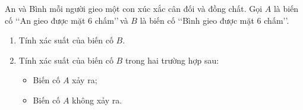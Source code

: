 \begin{bt}%
	An và Bình mỗi người gieo một con xúc xắc cân đối và đồng chất. Gọi $A$ là biến cố \lq\lq An gieo được mặt $6$ chấm\rq\rq $\,$và $B$ là biến cố \lq\lq Bình gieo được mặt $6$ chấm\rq\rq.
	\begin{enumerate}
		\item Tính xác suất của biến cố $B$.
		\item Tính xác suất của biến cố $B$ trong hai trường hợp sau:
		\begin{itemize}
			\item Biến cố $A$ xảy ra;
			\item Biến cố $A$ không xảy ra.
		\end{itemize}
	\end{enumerate}
\end{bt}


